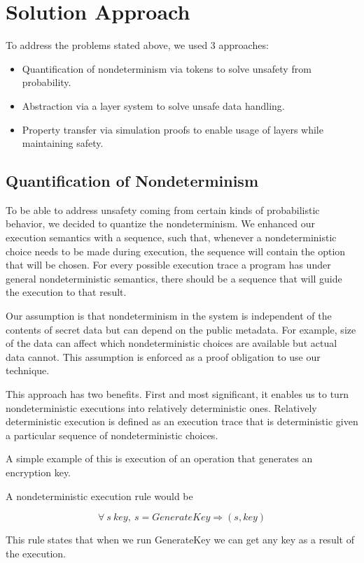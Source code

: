 
\section{Solution Approach}
To address the problems stated above, we used 3 approaches:
\begin{itemize}
	\item Quantification of nondeterminism via tokens to solve unsafety from probability.
	\item Abstraction via a layer system to solve unsafe data handling.
	\item Property transfer via simulation proofs to enable usage of layers while maintaining safety.
\end{itemize}


\subsection{Quantification of Nondeterminism}
To be able to address unsafety coming from certain kinds of probabilistic behavior, we decided to quantize the nondeterminism. We enhanced our execution semantics with a sequence, such that, whenever a nondeterministic choice needs to be made during execution, the sequence will contain the option that will be chosen. For every possible execution trace a program has under general nondeterministic semantics, there should be a sequence that will guide the execution to that result. 

Our assumption is that nondeterminism in the system is independent of the contents of secret data but can depend on the public metadata. For example, size of the data can affect which nondeterministic choices are available but actual data cannot. This assumption is enforced as a proof obligation to use our technique.

This approach has two benefits. First and most significant, it enables us to
turn nondeterministic executions into relatively deterministic ones. 
Relatively deterministic execution is defined as an execution trace that is 
deterministic given a particular sequence of nondeterministic choices.

A simple example of this is execution of an operation that generates an encryption key. 

A nondeterministic execution rule would be

$$\forall\ s\ key,\ s  =GenerateKey\Rightarrow (s, key)$$ 

This rule states that when we run GenerateKey we can get any key as a result of the execution.

